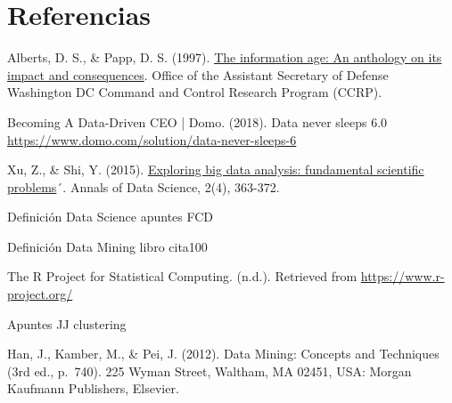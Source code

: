 \documentclass[3p,twocolumn]{elsarticle}
\begin{document}


\clearpage

\section{Referencias}
\renewcommand{\section}[2]{}
\begin{thebibliography}{X}

 Alberts, D. S., \& Papp, D. S. (1997). \href{http://www.dodccrp.org/files/Alberts_Anthology_I.pdf} {The information age: An anthology on its impact and consequences}. Office of the Assistant Secretary of Defense Washington DC Command and Control Research Program (CCRP).

 Becoming A Data-Driven CEO | Domo. (2018). Data never sleeps 6.0 \href{https://www.domo.com/solution/data-never-sleeps-6} {https://www.domo.com/solution/data-never-sleeps-6}

 Xu, Z., \& Shi, Y. (2015). \href {https://link.springer.com/content/pdf/10.1007/s40745-015-0063-7.pdf} {Exploring big data analysis: fundamental scientific problems}´. Annals of Data Science, 2(4), 363-372.

 Definición Data Science apuntes FCD

 Definición Data Mining libro cita100

 The R Project for Statistical Computing. (n.d.). Retrieved from \href{https://www.r-project.org/} {https://www.r-project.org/}

 Apuntes JJ clustering



Han, J., Kamber, M., \& Pei, J. (2012). Data Mining: Concepts and Techniques (3rd ed., p.~740). 225 Wyman Street, Waltham, MA 02451, USA: Morgan Kaufmann Publishers, Elsevier.

\end{thebibliography}
\end{document}
